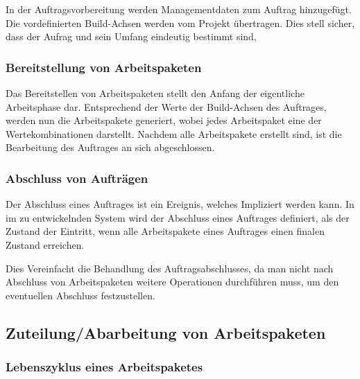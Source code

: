 In der Auftragsvorbereitung werden Managementdaten zum Auftrag hinzugef\"ugt.
Die vordefinierten Build-Achsen werden vom Projekt \"ubertragen.
Dies stell sicher, dass der Aufrag und sein Umfang eindeutig bestimmt sind,


\subsubsection{Bereitstellung von Arbeitspaketen}

Das Bereitstellen von Arbeitspaketen stellt den Anfang der eigentliche Arbeitsphase dar.
Entsprechend der Werte der Build-Achsen des Auftrages, werden nun die Arbeitspakete generiert,
wobei jedes Arbeitspaket eine der Wertekombinationen darstellt.
Nachdem alle Arbeitspakete erstellt sind, ist die Bearbeitung des Auftrages an sich abgeschlossen.

\subsubsection{Abschluss von Aufträgen}

Der Abschluss eines Auftrages ist ein Ereignis, welches Impliziert werden kann.
In im zu entwickelnden System wird der Abschluss eines Auftrages definiert,
als der Zustand der Eintritt, wenn alle Arbeitspakete eines Auftrages
einen finalen Zustand erreichen.

Dies Vereinfacht die Behandlung des Auftragsabschlusses,
da man nicht nach Abschluss von Arbeitspaketen weitere Operationen durchführen muss,
um den eventuellen Abschluss festzustellen.

\subsection{Zuteilung/Abarbeitung von Arbeitspaketen}


\subsubsection{Lebenszyklus eines Arbeitspaketes}



